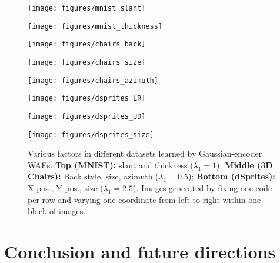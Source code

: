 \begin{figure}
	\begin{minipage}{0.5\textwidth}
		\centering
		\texttt{[image: figures/mnist\_slant]}
	\end{minipage}%
	\begin{minipage}{0.5\textwidth}
		\centering
		\texttt{[image: figures/mnist\_thickness]}
\end{minipage}

	\begin{minipage}{0.333\textwidth}
		\centering
		\texttt{[image: figures/chairs\_back]}
	\end{minipage}%
	\begin{minipage}{0.333\textwidth}
		\centering
		\texttt{[image: figures/chairs\_size]}
	\end{minipage}%
	\begin{minipage}{0.3333\textwidth}
		\centering
		\texttt{[image: figures/chairs\_azimuth]}
	\end{minipage}

	\begin{minipage}{0.333\textwidth}
		\centering
		\texttt{[image: figures/dsprites\_LR]}
	\end{minipage}%
	\begin{minipage}{0.333\textwidth}
		\centering
		\texttt{[image: figures/dsprites\_UD]}
	\end{minipage}%
	\begin{minipage}{0.3333\textwidth}
		\centering
		\texttt{[image: figures/dsprites\_size]}
	\end{minipage}
\caption{Various factors in different datasets learned by Gaussian-encoder WAEs. \textbf{Top (MNIST):} slant and thickness ($\lambda_1=1$);
\textbf{Middle (3D Chairs):} Back style, size, azimuth ($\lambda_1=0.5$);  
\textbf{Bottom (dSprites):} X-pos., Y-pos., size ($\lambda_1=2.5$).
Images generated by fixing one code per row and varying one coordinate from left to right within one block of images.
}

\end{figure}

\vspace{-0.2cm}

\section{Conclusion and future directions}

